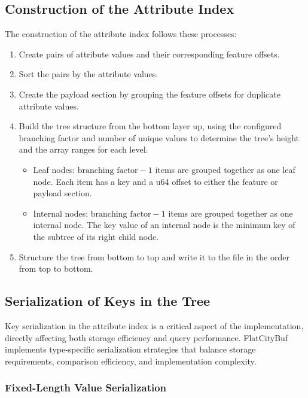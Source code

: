 \subsection{Construction of the Attribute Index}
\label{methodology:attribute_index:construction}

The construction of the attribute index follows these processes:

\begin{enumerate}
\item Create pairs of attribute values and their corresponding feature offsets.
\item Sort the pairs by the attribute values.
\item Create the payload section by grouping the feature offsets for duplicate attribute values.
\item Build the tree structure from the bottom layer up, using the configured branching factor and number of unique values to determine the tree's height and the array ranges for each level.
\begin{itemize}
  \item Leaf nodes: $\text{branching factor} - 1$ items are grouped together as one leaf node. Each item has a key and a u64 offset to either the feature or payload section.
  \item Internal nodes: $\text{branching factor} - 1$ items are grouped together as one internal node. The key value of an internal node is the minimum key of the subtree of its right child node.
\end{itemize}
\item Structure the tree from bottom to top and write it to the file in the order from top to bottom.
\end{enumerate}

\subsection{Serialization of Keys in the Tree}
\label{methodology:attribute_index:key_serialization}

Key serialization in the attribute index is a critical aspect of the implementation, directly affecting both storage efficiency and query performance. FlatCityBuf implements type-specific serialization strategies that balance storage requirements, comparison efficiency, and implementation complexity.

\subsubsection{Fixed-Length Value Serialization}
\label{methodology:attribute_index:fixed_length_serialization}

